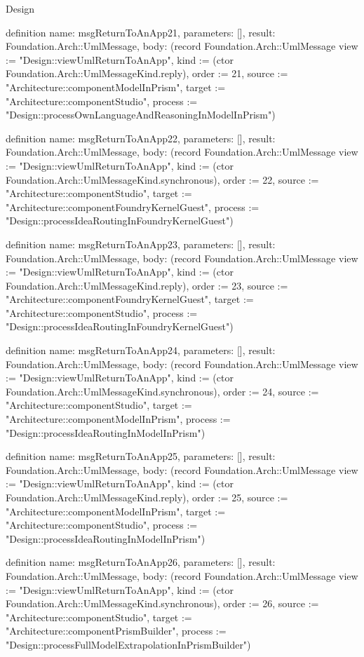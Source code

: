 \begin{lexlean}{Design}
\begin{semanticmodule}
definition{
  name: msgReturnToAnApp21,
  parameters: [],
  result: Foundation.Arch::UmlMessage,
  body: (record Foundation.Arch::UmlMessage {view := "Design::viewUmlReturnToAnApp", kind := (ctor Foundation.Arch::UmlMessageKind.reply), order := 21, source := "Architecture::componentModelInPrism", target := "Architecture::componentStudio", process := "Design::processOwnLanguageAndReasoningInModelInPrism"})
}

definition{
  name: msgReturnToAnApp22,
  parameters: [],
  result: Foundation.Arch::UmlMessage,
  body: (record Foundation.Arch::UmlMessage {view := "Design::viewUmlReturnToAnApp", kind := (ctor Foundation.Arch::UmlMessageKind.synchronous), order := 22, source := "Architecture::componentStudio", target := "Architecture::componentFoundryKernelGuest", process := "Design::processIdeaRoutingInFoundryKernelGuest"})
}

definition{
  name: msgReturnToAnApp23,
  parameters: [],
  result: Foundation.Arch::UmlMessage,
  body: (record Foundation.Arch::UmlMessage {view := "Design::viewUmlReturnToAnApp", kind := (ctor Foundation.Arch::UmlMessageKind.reply), order := 23, source := "Architecture::componentFoundryKernelGuest", target := "Architecture::componentStudio", process := "Design::processIdeaRoutingInFoundryKernelGuest"})
}

definition{
  name: msgReturnToAnApp24,
  parameters: [],
  result: Foundation.Arch::UmlMessage,
  body: (record Foundation.Arch::UmlMessage {view := "Design::viewUmlReturnToAnApp", kind := (ctor Foundation.Arch::UmlMessageKind.synchronous), order := 24, source := "Architecture::componentStudio", target := "Architecture::componentModelInPrism", process := "Design::processIdeaRoutingInModelInPrism"})
}

definition{
  name: msgReturnToAnApp25,
  parameters: [],
  result: Foundation.Arch::UmlMessage,
  body: (record Foundation.Arch::UmlMessage {view := "Design::viewUmlReturnToAnApp", kind := (ctor Foundation.Arch::UmlMessageKind.reply), order := 25, source := "Architecture::componentModelInPrism", target := "Architecture::componentStudio", process := "Design::processIdeaRoutingInModelInPrism"})
}

definition{
  name: msgReturnToAnApp26,
  parameters: [],
  result: Foundation.Arch::UmlMessage,
  body: (record Foundation.Arch::UmlMessage {view := "Design::viewUmlReturnToAnApp", kind := (ctor Foundation.Arch::UmlMessageKind.synchronous), order := 26, source := "Architecture::componentStudio", target := "Architecture::componentPrismBuilder", process := "Design::processFullModelExtrapolationInPrismBuilder"})
}


\end{semanticmodule}
\end{lexlean}
